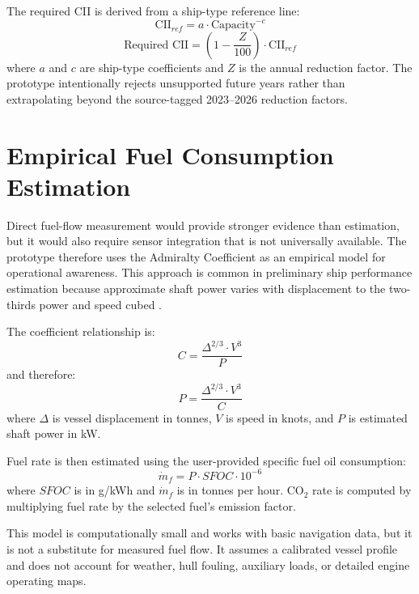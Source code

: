 The required CII is derived from a ship-type reference line:
\begin{equation}
    \text{CII}_{ref} = a \cdot \text{Capacity}^{-c}
    \label{eq:cii-reference}
\end{equation}
\begin{equation}
    \text{Required CII} = \left(1 - \frac{Z}{100}\right) \cdot \text{CII}_{ref}
    \label{eq:required-cii}
\end{equation}
where $a$ and $c$ are ship-type coefficients and $Z$ is the annual reduction factor. The prototype intentionally rejects unsupported future years rather than extrapolating beyond the source-tagged 2023--2026 reduction factors.

\section{Empirical Fuel Consumption Estimation}
Direct fuel-flow measurement would provide stronger evidence than estimation, but it would also require sensor integration that is not universally available. The prototype therefore uses the Admiralty Coefficient as an empirical model for operational awareness. This approach is common in preliminary ship performance estimation because approximate shaft power varies with displacement to the two-thirds power and speed cubed \cite{molland2017shipResistance}.

The coefficient relationship is:
\begin{equation}
    C = \frac{\Delta^{2/3} \cdot V^3}{P}
    \label{eq:admiralty-base}
\end{equation}
and therefore:
\begin{equation}
    P = \frac{\Delta^{2/3} \cdot V^3}{C}
    \label{eq:admiralty-power}
\end{equation}
where $\Delta$ is vessel displacement in tonnes, $V$ is speed in knots, and $P$ is estimated shaft power in kW.

Fuel rate is then estimated using the user-provided specific fuel oil consumption:
\begin{equation}
    \dot{m}_f = P \cdot SFOC \cdot 10^{-6}
    \label{eq:fuel-estimation}
\end{equation}
where $SFOC$ is in g/kWh and $\dot{m}_f$ is in tonnes per hour. CO$_2$ rate is computed by multiplying fuel rate by the selected fuel's emission factor.

This model is computationally small and works with basic navigation data, but it is not a substitute for measured fuel flow. It assumes a calibrated vessel profile and does not account for weather, hull fouling, auxiliary loads, or detailed engine operating maps.

